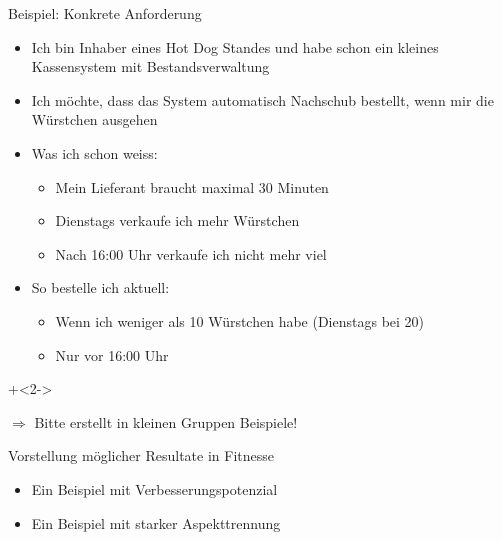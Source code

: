 \begin{frame}{Beispiel: Konkrete Anforderung}

\begin{itemize}
	\item Ich bin Inhaber eines Hot Dog Standes und habe schon ein kleines Kassensystem mit Bestandsverwaltung
	\item Ich möchte, dass das System automatisch Nachschub bestellt, wenn mir die Würstchen ausgehen
	
	\item Was ich schon weiss:
	\begin{itemize}
		\item Mein Lieferant braucht maximal 30 Minuten
		\item Dienstags verkaufe ich mehr Würstchen
		\item Nach 16:00 Uhr verkaufe ich nicht mehr viel
	\end{itemize}
	
	\item So bestelle ich aktuell:
	\begin{itemize}
		\item Wenn ich weniger als 10 Würstchen habe (Dienstags bei 20)
		\item Nur vor 16:00 Uhr
	\end{itemize}
\end{itemize}

\onslide+<2->
	
$\Rightarrow$ Bitte erstellt in kleinen Gruppen Beispiele!

\end{frame}

\begin{frame}{Vorstellung möglicher Resultate in Fitnesse}

\begin{itemize}
	\item Ein Beispiel mit Verbesserungspotenzial
	\item Ein Beispiel mit starker Aspekttrennung
\end{itemize}

\end{frame}

